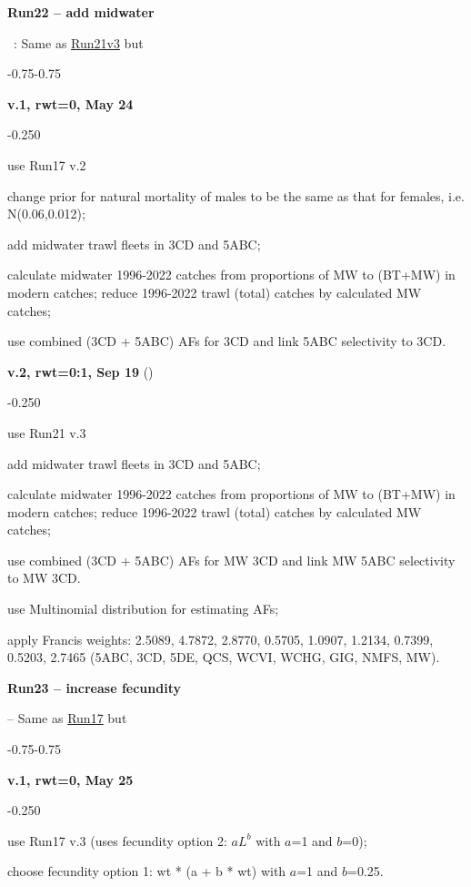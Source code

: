 \hypertarget{R22}{\textbf{Run22 -- add midwater}}~: Same as \hyperlink{R21}{Run21v3} but
\begin{itemize_csas}{-0.75}{-0.75}
	\item \textbf{v.1, rwt=0, May 24}
	\begin{itemize_csas}{-0.25}{0}
		\item use Run17 v.2
		\item change prior for natural mortality of males to be the same as that for females, i.e. N(0.06,0.012);
		\item add midwater trawl fleets in 3CD and 5ABC;
		\item calculate midwater 1996-2022 catches from proportions of MW to (BT+MW) in modern catches; reduce 1996-2022 trawl (total) catches by calculated MW catches;
		\item use combined (3CD + 5ABC) AFs for 3CD and link 5ABC selectivity to 3CD.
	\end{itemize_csas}
	\item \textbf{v.2, rwt=0:1, Sep 19} ()
	\begin{itemize_csas}{-0.25}{0}
		\item use Run21 v.3
		\item add midwater trawl fleets in 3CD and 5ABC;
		\item calculate midwater 1996-2022 catches from proportions of MW to (BT+MW) in modern catches; reduce 1996-2022 trawl (total) catches by calculated MW catches;
		\item use combined (3CD + 5ABC) AFs for MW 3CD and link MW 5ABC selectivity to MW 3CD.
		\item use Multinomial distribution for estimating AFs;
		\item apply Francis weights: 2.5089, 4.7872, 2.8770, 0.5705, 1.0907, 1.2134, 0.7399, 0.5203, 2.7465 (5ABC, 3CD, 5DE, QCS, WCVI, WCHG, GIG, NMFS, MW).
	\end{itemize_csas}
\end{itemize_csas}

\hypertarget{R23}{\textbf{Run23 -- increase fecundity}} -- Same as \hyperlink{R17}{Run17} but
\begin{itemize_csas}{-0.75}{-0.75}
	\item \textbf{v.1, rwt=0, May 25}
	\begin{itemize_csas}{-0.25}{0}
		\item use Run17 v.3 (uses fecundity option 2: $aL^b$ with $a$=1 and $b$=0);
		\item choose fecundity option 1: wt * (a + b * wt) with $a$=1 and $b$=0.25.
	\end{itemize_csas}
\end{itemize_csas}

